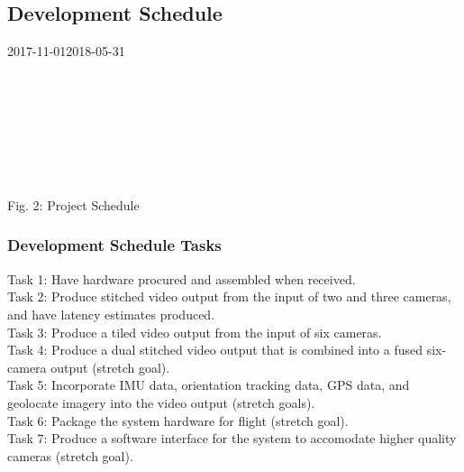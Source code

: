 \subsection{Development Schedule}
	\begin{ganttchart}
    	[hgrid, x unit=0.77mm, y unit chart=9.0mm, title label font=\normalsize, time slot format=isodate]
    	{2017-11-01}{2018-05-31}
    	\\
    	\\
    	\\
    	\\
    	\\
    	\\
    	\\
    	\\
	\end{ganttchart}
\begin{center}
	Fig. 2: Project Schedule
\end{center}	

\subsubsection{Development Schedule Tasks}
Task 1: Have hardware procured and assembled when received.\\
Task 2: Produce stitched video output from the input of two and three cameras, 
and have latency estimates produced.\\
Task 3: Produce a tiled video output from the input of six cameras.\\
Task 4: Produce a dual stitched video output that is combined into a fused 
six-camera output (stretch goal).\\
Task 5: Incorporate IMU data, orientation tracking data, GPS data, and 
geolocate imagery into the video output (stretch goals).\\
Task 6: Package the system hardware for flight (stretch goal).\\
Task 7: Produce a software interface for the system to accomodate higher 
quality cameras (stretch goal).\\